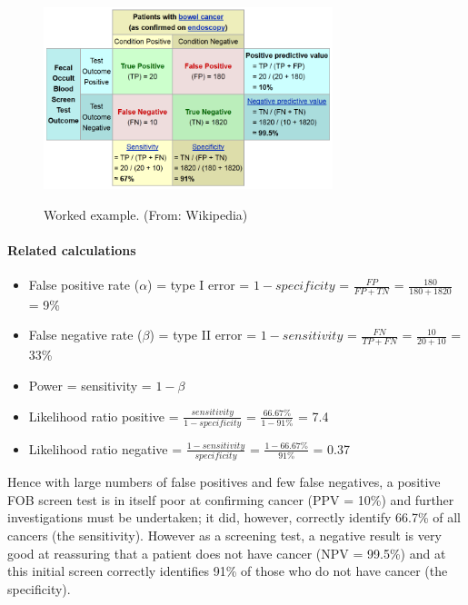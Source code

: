 \begin{figure}[ht]
  \centering
  \includegraphics[width=0.75\textwidth]{../Images/Sensitivity_Specificity_Example.png}\\
  \caption{Worked example. (From: Wikipedia)}\label{fig:sens_spec_example}
\end{figure}

\paragraph{Related calculations}

\begin{itemize}
  \item False positive rate ($\alpha$) = type I error = $1-specificity$ = $\frac{FP}{FP + TN}$ = $\frac{180}{180+1820}$ = 9\%
  \item False negative rate ($\beta$) = type II error = $1−sensitivity$ = $\frac{FN}{TP + FN}$ = $\frac{10}{20+10}$ = 33\%
  \item Power = sensitivity = $1−\beta$
  \item Likelihood ratio positive = $\frac{sensitivity}{1−specificity}$ = $\frac{66.67\%}{1−91\%}$ = 7.4
  \item Likelihood ratio negative = $\frac{1−sensitivity}{specificity}$ = $\frac{1−66.67\%}{91\%}$ = 0.37
\end{itemize}

Hence with large numbers of false positives and few false negatives, a positive FOB screen test is in itself poor at confirming cancer (PPV = 10\%) and further investigations must be undertaken; it did, however, correctly identify 66.7\% of all cancers (the sensitivity). However as a screening test, a negative result is very good at reassuring that a patient does not have cancer (NPV = 99.5\%) and at this initial screen correctly identifies 91\% of those who do not have cancer (the specificity).

